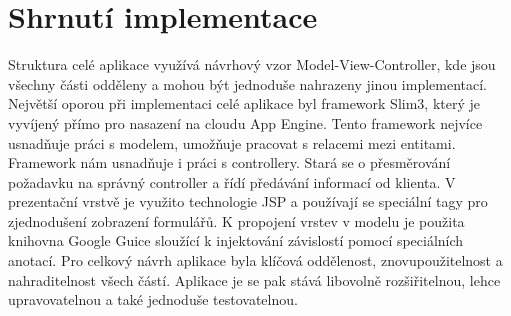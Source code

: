 \section{Shrnutí implementace}
Struktura celé aplikace využívá návrhový vzor Model-View-Controller, kde jsou všechny části odděleny a mohou být jednoduše nahrazeny jinou implementací. Největší oporou při implementaci celé aplikace byl framework Slim3, který je vyvíjený přímo pro nasazení na cloudu App Engine. Tento framework nejvíce usnadňuje práci s modelem, umožňuje pracovat s relacemi mezi entitami. Framework nám usnadňuje i práci s controllery. Stará se o přesměrování požadavku na správný controller a řídí předávání informací od klienta. V prezentační vrstvě je využito technologie JSP a používají se speciální tagy pro zjednodušení zobrazení formulářů. K propojení vrstev v modelu je použita knihovna Google Guice sloužící k injektování závislostí pomocí speciálních anotací. Pro celkový návrh aplikace byla klíčová oddělenost, znovupoužitelnost a nahraditelnost všech částí. Aplikace je se pak stává libovolně rozšiřitelnou, lehce upravovatelnou a také jednoduše testovatelnou.